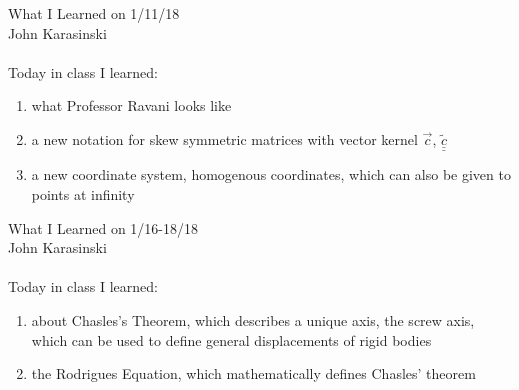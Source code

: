 \documentclass[12pt]{report}
\def\doubleunderline#1{\underline{\underline{#1}}}
\begin{document}
\noindent\huge{What I Learned on 1/11/18}\\
\large{John Karasinski}\\
\\
Today in class I learned:
\begin{enumerate}
\item what Professor Ravani looks like
\item a new notation for skew symmetric matrices with vector kernel $\overrightarrow{c}$, $\widetilde{\doubleunderline{c}}$
\item a new coordinate system, homogenous coordinates, which can also be given to points at infinity
\end{enumerate}

\clearpage
\noindent\huge{What I Learned on 1/16-18/18}\\
\large{John Karasinski}\\
\\
Today in class I learned:
\begin{enumerate}
\item about Chasles's Theorem, which describes a unique axis, the screw axis, which can be used to define general displacements of rigid bodies
\item the Rodrigues Equation, which mathematically defines Chasles' theorem
\end{enumerate}
\end{document}
